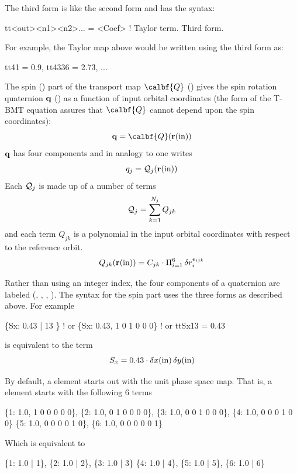 {The third form is like the second form and has the syntax:
\begin{example}
  tt<out><n1><n2>...  = <Coef>                      ! Taylor term. Third form.
\end{example}
For example, the Taylor map above would be written using the third form as:
\begin{example}
  tt41 = 0.9, tt4336 = 2.73, ...
\end{example}

The spin () part of the transport map $\calbf{Q}$ () gives the
spin rotation quaternion ${\bf q}$ () as a function of input orbital coordinates (the form of the
T-BMT equation assures that $\calbf{Q}$ cannot depend upon the spin coordinates):
\begin{equation}
  \bfq = \calbf{Q}(\bfr(\In))
\end{equation}
${\bf q}$ has four components and in analogy to  one writes
\begin{equation}
  q_j = {\cal Q}_j({\bf r}({\text{in}}))
  \label{qqr}
\end{equation}
Each ${\cal Q}_j$ is made up of a number of terms
\begin{equation}
  {\cal Q}_j = \sum_{k = 1}^{N_j} Q_{jk}
\end{equation}
and each term $Q_{jk}$ is a polynomial in the input orbital coordinates with respect to the reference orbit.
\begin{equation}
  Q_{jk}({\bf r}({\text{in}})) = C_{jk} \cdot \Pi_{i = 1}^6 \, \delta r_i^{e_{ijk}}
  \label{qcpd}
\end{equation}

Rather than using an integer index, the four components of a quaternion are labeled (,
, , ). The syntax for the spin part uses the three forms as
described above. For example
\begin{example}
  \{Sx: 0.43 | 13 \}          ! or
  \{Sx: 0.43, 1 0 1 0 0 0\}   ! or
  ttSx13 = 0.43
\end{example}
is equivalent to the term
\begin{equation}
  S_x = 0.43 \cdot \delta x({\text{in}}) \, \delta y({\text{in}})
\end{equation}

By default, a  element starts out with the unit phase space map.  That is, a 
element starts with the following 6 terms
\begin{example}
  \{1: 1.0, 1 0 0 0 0 0\}, \{2: 1.0, 0 1 0 0 0 0\},
  \{3: 1.0, 0 0 1 0 0 0\}, \{4: 1.0, 0 0 0 1 0 0\}
  \{5: 1.0, 0 0 0 0 1 0\}, \{6: 1.0, 0 0 0 0 0 1\}
\end{example}
Which is equivalent to
\begin{example}
  \{1: 1.0 | 1\}, \{2: 1.0 | 2\}, \{3: 1.0 | 3\}
  \{4: 1.0 | 4\}, \{5: 1.0 | 5\}, \{6: 1.0 | 6\}
\end{example}

}
